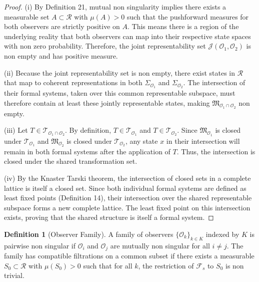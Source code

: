 \documentclass[12pt]{article}
\theoremstyle{definition}
\newtheorem{definition}{Definition}
\begin{document}
\begin{proof}
(i) By Definition 21, mutual non singularity implies there exists a measurable set $A \subset \mathcal{R}$ with $\mu(A) > 0$ such that the pushforward measures for both observers are strictly positive on $A$. This means there is a region of the underlying reality that both observers can map into their respective state spaces with non zero probability. Therefore, the joint representability set $\mathcal{J}(\mathcal{O}_1, \mathcal{O}_2)$ is non empty and has positive measure.

(ii) Because the joint representability set is non empty, there exist states in $\mathcal{R}$ that map to coherent representations in both $\Sigma_{\mathcal{O}_1}$ and $\Sigma_{\mathcal{O}_2}$. The intersection of their formal systems, taken over this common representable subspace, must therefore contain at least these jointly representable states, making $\mathfrak{M}_{\mathcal{O}_1 \cap \mathcal{O}_2}$ non empty.

(iii) Let $T \in \mathcal{T}_{\mathcal{O}_1 \cap \mathcal{O}_2}$. By definition, $T \in \mathcal{T}_{\mathcal{O}_1}$ and $T \in \mathcal{T}_{\mathcal{O}_2}$. Since $\mathfrak{M}_{\mathcal{O}_1}$ is closed under $\mathcal{T}_{\mathcal{O}_1}$ and $\mathfrak{M}_{\mathcal{O}_2}$ is closed under $\mathcal{T}_{\mathcal{O}_2}$, any state $x$ in their intersection will remain in both formal systems after the application of $T$. Thus, the intersection is closed under the shared transformation set.

(iv) By the Knaster Tarski theorem, the intersection of closed sets in a complete lattice is itself a closed set. Since both individual formal systems are defined as least fixed points (Definition 14), their intersection over the shared representable subspace forms a new complete lattice. The least fixed point on this intersection exists, proving that the shared structure is itself a formal system.
\end{proof}

\begin{definition}[Observer Family]
A family of observers $\{\mathcal{O}_k\}_{k \in K}$ indexed by $K$ is pairwise non singular if $\mathcal{O}_i$ and $\mathcal{O}_j$ are mutually non singular for all $i \neq j$. The family has compatible filtrations on a common subset if there exists a measurable $S_0 \subset \mathcal{R}$ with $\mu(S_0) > 0$ such that for all $k$, the restriction of $\mathcal{F}_s$ to $S_0$ is non trivial.
\end{definition}
\end{document}
